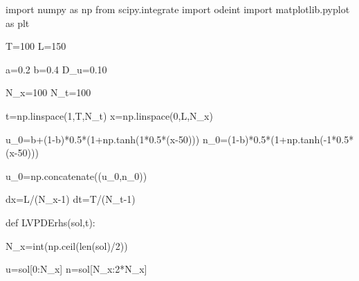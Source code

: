 \documentclass[
  letterpaper,
  DIV=11,
  numbers=noendperiod]{scrreprt}
\newenvironment{Shaded}{\begin{snugshade}}{\end{snugshade}}
\newcommand{\BuiltInTok}[1]{\textcolor[rgb]{0.00,0.23,0.31}{#1}}
\newcommand{\DecValTok}[1]{\textcolor[rgb]{0.68,0.00,0.00}{#1}}
\newcommand{\FloatTok}[1]{\textcolor[rgb]{0.68,0.00,0.00}{#1}}
\newcommand{\ImportTok}[1]{\textcolor[rgb]{0.00,0.46,0.62}{#1}}
\newcommand{\KeywordTok}[1]{\textcolor[rgb]{0.00,0.23,0.31}{#1}}
\newcommand{\NormalTok}[1]{\textcolor[rgb]{0.00,0.23,0.31}{#1}}
\newcommand{\OperatorTok}[1]{\textcolor[rgb]{0.37,0.37,0.37}{#1}}
\theoremstyle{plain}
\theoremstyle{definition}
\theoremstyle{plain}
\theoremstyle{remark}
\begin{document}
\begin{Shaded}
\begin{Highlighting}[]
\ImportTok{import}\NormalTok{ numpy }\ImportTok{as}\NormalTok{ np}
\ImportTok{from}\NormalTok{ scipy.integrate }\ImportTok{import}\NormalTok{ odeint}
\ImportTok{import}\NormalTok{ matplotlib.pyplot }\ImportTok{as}\NormalTok{ plt}

\NormalTok{T}\OperatorTok{=}\DecValTok{100}
\NormalTok{L}\OperatorTok{=}\DecValTok{150}

\NormalTok{a}\OperatorTok{=}\FloatTok{0.2}
\NormalTok{b}\OperatorTok{=}\FloatTok{0.4}
\NormalTok{D\_u}\OperatorTok{=}\FloatTok{0.10}

\NormalTok{N\_x}\OperatorTok{=}\DecValTok{100}
\NormalTok{N\_t}\OperatorTok{=}\DecValTok{100}

\NormalTok{t}\OperatorTok{=}\NormalTok{np.linspace(}\DecValTok{1}\NormalTok{,T,N\_t)}
\NormalTok{x}\OperatorTok{=}\NormalTok{np.linspace(}\DecValTok{0}\NormalTok{,L,N\_x)}

\NormalTok{u\_0}\OperatorTok{=}\NormalTok{b}\OperatorTok{+}\NormalTok{(}\DecValTok{1}\OperatorTok{{-}}\NormalTok{b)}\OperatorTok{*}\FloatTok{0.5}\OperatorTok{*}\NormalTok{(}\DecValTok{1}\OperatorTok{+}\NormalTok{np.tanh(}\DecValTok{1}\OperatorTok{*}\FloatTok{0.5}\OperatorTok{*}\NormalTok{(x}\OperatorTok{{-}}\DecValTok{50}\NormalTok{)))}
\NormalTok{n\_0}\OperatorTok{=}\NormalTok{(}\DecValTok{1}\OperatorTok{{-}}\NormalTok{b)}\OperatorTok{*}\FloatTok{0.5}\OperatorTok{*}\NormalTok{(}\DecValTok{1}\OperatorTok{+}\NormalTok{np.tanh(}\OperatorTok{{-}}\DecValTok{1}\OperatorTok{*}\FloatTok{0.5}\OperatorTok{*}\NormalTok{(x}\OperatorTok{{-}}\DecValTok{50}\NormalTok{)))}

\NormalTok{u\_0}\OperatorTok{=}\NormalTok{np.concatenate((u\_0,n\_0))}

\NormalTok{dx}\OperatorTok{=}\NormalTok{L}\OperatorTok{/}\NormalTok{(N\_x}\OperatorTok{{-}}\DecValTok{1}\NormalTok{)}
\NormalTok{dt}\OperatorTok{=}\NormalTok{T}\OperatorTok{/}\NormalTok{(N\_t}\OperatorTok{{-}}\DecValTok{1}\NormalTok{)}

\KeywordTok{def}\NormalTok{ LVPDErhs(sol,t):}

\NormalTok{    N\_x}\OperatorTok{=}\BuiltInTok{int}\NormalTok{(np.ceil(}\BuiltInTok{len}\NormalTok{(sol)}\OperatorTok{/}\DecValTok{2}\NormalTok{))}

\NormalTok{    u}\OperatorTok{=}\NormalTok{sol[}\DecValTok{0}\NormalTok{:N\_x]}
\NormalTok{    n}\OperatorTok{=}\NormalTok{sol[N\_x:}\DecValTok{2}\OperatorTok{*}\NormalTok{N\_x]}




\end{Highlighting}
\end{Shaded}
\end{document}
